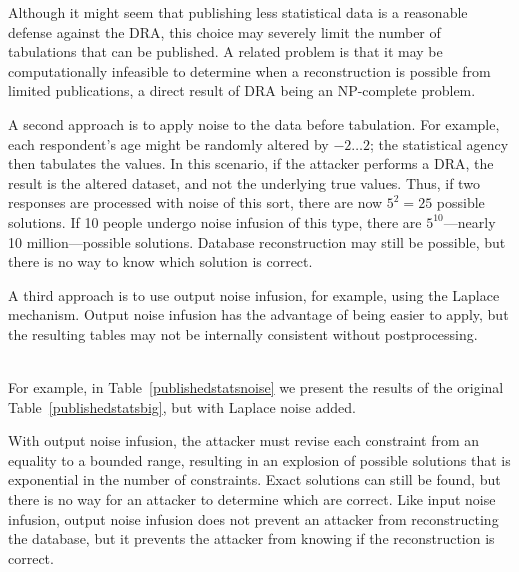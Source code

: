 \documentclass[runningheads]{llncs}
\newif\ifshortversion
\newif\iflongversion
\begin{document}
Although it might seem that publishing less statistical data is a
reasonable defense against the DRA, this choice may severely limit the number
of tabulations that can be published. A
related problem is that it may be computationally infeasible to
determine when a reconstruction is possible from limited publications, a direct result of DRA being an NP-complete
problem. \iflongversion That is, the inability of a SAT
solver to find a solution to a SAT problem does not mean that a
solution is not possible---it may just mean that the attacker hasn't waited
long enough.\fi

A second approach is to apply noise to the data before
tabulation. For example, each respondent's age might be randomly altered by $-2 \ldots 2$; 
the statistical agency then tabulates the values. 
In this scenario, if the attacker performs a DRA, the result is the altered dataset, and not the underlying true values. Thus, if two responses
are processed with noise of this sort, there are now $5^2 = 25$
possible solutions. If 10 people undergo noise infusion of this type,
there are $5^{10}$---nearly 10 million---possible
solutions. Database reconstruction may still be possible, but there is no
way to know which solution is correct.

A third approach is to use output noise infusion, for example, using
the Laplace mechanism\cite{Dwork:2006:CNS:2180286.2180305}. Output
noise infusion has the advantage of being easier to apply, but the resulting tables may not be internally consistent without postprocessing.
\ifshortversion
The rightmost column of Table~\ref{publishedstatsbig} shows the results of output noise infusion.
\else
\\
For example, in Table~\ref{publishedstatsnoise} we present the results
of the original Table~\ref{publishedstatsbig}, but with Laplace noise
added.  
\fi
With output noise infusion, the attacker must revise each constraint from an equality to a bounded range, resulting in an explosion of possible solutions that is exponential in the number of constraints. Exact solutions can still be found, but there is no way for an attacker to determine which are correct. 
 Like input noise infusion, output noise infusion does not prevent an attacker from reconstructing the database, but it prevents the attacker from knowing if the reconstruction is correct.
\end{document}
